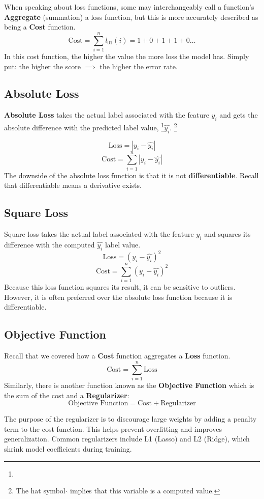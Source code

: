 When speaking about loss functions, some may interchangeably call a function's \textbf{Aggregate} (summation) a loss function, but this is more accurately described as being a \textbf{Cost} function.
\[ 
\text{Cost} = \sum_{i=1}^{n} l_{01}(i) = 1 + 0 + 1 + 1 + 0 \ldots
\]
In this cost function, the higher the value the more loss the model has. Simply put: the higher the score $\implies$ the higher the error rate.

\subsection{Absolute Loss}
\textbf{Absolute Loss} takes the actual label associated with the feature $y_i$ and gets the absolute difference with the predicted label value, \footnote{}$\hat{y_i}$.
\footnote[1]{The hat symbol $\hat{}$ implies that this variable is a computed value.}

\[ 
\text{Loss} = |y_i - \hat{y_i}|
\]
\[ 
\text{Cost} = \sum_{i=1}^{n} |y_i - \hat{y_i}|
\]
The downside of the absolute loss function is that it is not \textbf{differentiable}. Recall that differentiable means a derivative exists.

\subsection{Square Loss}
Square loss takes the actual label associated with the feature $y_i$ and squares its difference with the computed $\hat{y_i}$ label value.
\[ 
\text{Loss} = (y_i - \hat{y_i})^2
\]
\[ 
\text{Cost} = \sum_{i=1}^{n} (y_i - \hat{y_i})^2
\]
Because this loss function squares its result, it can be sensitive to outliers. However, it is often preferred over the absolute loss function because it is differentiable.

\subsection{Objective Function}
Recall that we covered how a \textbf{Cost} function aggregates a \textbf{Loss} function.
\[ 
\text{Cost} = \sum_{i=1}^{n} \text{Loss}
\]
Similarly, there is another function known as the \textbf{Objective Function} which is the sum of the cost and a \textbf{Regularizer}:
\[ 
\text{Objective Function} = \text{Cost} + \text{Regularizer}
\]

The purpose of the regularizer is to discourage large weights by adding a penalty term to the cost function. This helps prevent overfitting and improves generalization. Common regularizers include L1 (Lasso) \cite{tibshirani1996lasso} and L2 (Ridge), which shrink model coefficients during training.

